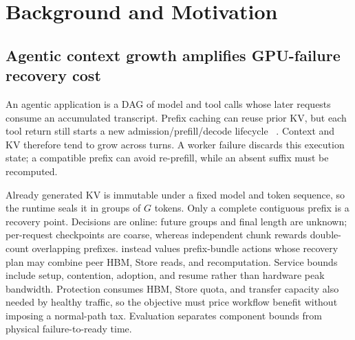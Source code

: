\section{Background and Motivation}
\label{sec:background}



\subsection{Agentic context growth amplifies GPU-failure recovery cost}

An agentic application is a DAG of model and tool calls whose later requests
consume an accumulated transcript.  Prefix caching can reuse prior KV, but
each tool return still starts a new admission/prefill/decode lifecycle
~\cite{abhyankar2024infercept}.  Context and KV therefore tend to grow across
turns.  A worker failure discards this execution state; a compatible prefix can
avoid re-prefill, while an absent suffix must be recomputed.

Already generated KV is immutable under a fixed model and token sequence, so
the runtime seals it in groups of $G$ tokens.  Only a complete contiguous
prefix is a recovery point.  Decisions are online: future groups and final
length are unknown; per-request checkpoints are coarse, whereas independent
chunk rewards double-count overlapping prefixes.  \system{} instead values
prefix-bundle actions whose recovery plan may combine peer HBM, Store reads,
and recomputation.  Service bounds include setup, contention, adoption, and
resume rather than hardware peak bandwidth.  Protection consumes HBM, Store
quota, and transfer capacity also needed by healthy traffic, so the objective
must price workflow benefit without imposing a normal-path tax.  Evaluation
separates component bounds from physical failure-to-ready time.

